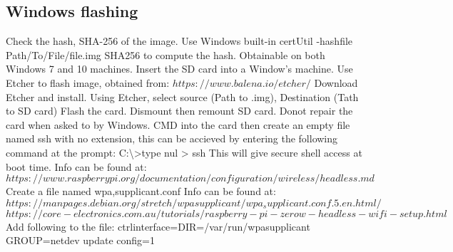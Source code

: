 \documentclass[a4paper,12pt]{article}
\begin{document}
\subsection{Windows flashing}
Check the hash, SHA-256 of the image.
\newline
Use Windows built-in certUtil -hashfile Path/To/File/file.img SHA256 to compute the hash. Obtainable on both Windows 7 and 10 machines.
\newline
Insert the SD card into a Window's machine.
\newline
Use Etcher to flash image, obtained from:
\newline
$https://www.balena.io/etcher/$
\newline
Download Etcher and install.
\newline
Using Etcher, select source (Path to  .img), Destination (Tath to SD card)
Flash the card.
\newline
Dismount then remount SD card.
Donot repair the card when asked to by Windows.
\newline
CMD into the card then create an empty file named ssh with no extension, this can be accieved by entering the following command at the prompt:
\newline
C:\textbackslash \textgreater  type nul > ssh
\newline
This will give secure shell access at boot time.
\newline
Info can be found at:
\newline
$https://www.raspberrypi.org/documentation/configuration/wireless/headless.md
$
\newline
\newline
Create a file named wpa\textunderscore,supplicant.conf
\newline
Info can be found at:
\newline
$https://manpages.debian.org/stretch/wpasupplicant/wpa_supplicant.conf.5.en.html/
$
\newline
\newline
$https://core-electronics.com.au/tutorials/raspberry-pi-zerow-headless-wifi-setup.html$
\newline
\newline
Add following to the file:
\newline
\newline
ctrl\textunderscore interface=DIR=/var/run/wpa\textunderscore supplicant GROUP=netdev
\newline
update\textunderscore
config=1
\newline
\end{document}
